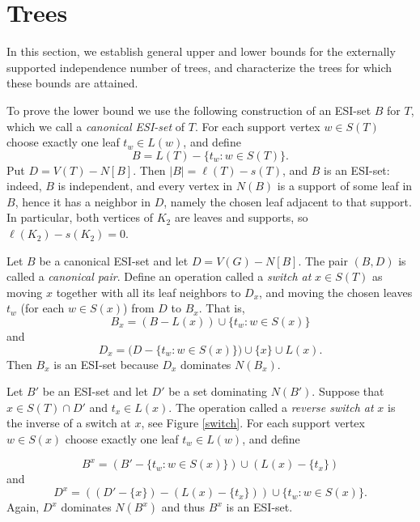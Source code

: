 \documentclass[11pt]{article}
\begin{document}
\section{Trees}\label{tr}


In this section, we establish general upper and lower bounds for the externally supported independence number of trees, and characterize the trees for which these bounds are attained.


To prove the lower bound we use the following construction of an ESI-set $B$ for $T$, which we call a \emph{canonical ESI-set} of $T$. For each support vertex $w\in S(T)$ choose exactly one leaf
$t_w\in L(w)$, and define
$$B=L(T)-\{t_w: w\in S(T)\}.$$
Put $D=V(T)-N[B]$. Then $|B|=\ell(T)-s(T)$, and $B$ is an ESI-set: indeed, $B$ is
independent, and every vertex in $N(B)$ is a support of some leaf in $B$, hence it has a
neighbor in $D$, namely the chosen leaf adjacent to that support. In particular, both vertices of
$K_2$ are leaves and supports, so $\ell(K_2)-s(K_2)=0$.

Let $B$ be a canonical ESI-set and let $D=V(G)-N[B]$. The pair $(B,D)$ is called a \emph{canonical pair}. Define an operation called a \emph{switch at} $x\in S(T)$ as moving $x$ together with all its leaf neighbors to $D_x$, and moving the
chosen leaves $t_w$ (for each $w\in S(x)$) from $D$ to $B_x$. That is,
\[
B_x=(B- L(x))\cup \{t_w:w\in S(x)\}
\]
and
\[
D_x=\bigl(D-\{t_w:w\in S(x)\}\bigr)\cup\{x\}\cup L(x).
\]
Then $B_x$ is an ESI-set because
$D_x$ dominates $N(B_x)$.

Let $B'$ be an ESI-set and let $D'$ be a set dominating $N(B')$. Suppose that $x\in S(T)\cap D'$ and $t_x\in L(x)$. The operation called a \emph{reverse switch at} $x$ is the inverse of a switch at $x$, see Figure \ref{switch}. For each support vertex $w\in S(x)$ choose exactly one leaf
$t_w\in L(w)$, and define
 
\[
B^x=(B'-\{t_w:w\in S(x)\})\cup (L(x)-\{t_x\}) 
\]
and
\[
D^x=((D'-\{x\})-(L(x)-\{t_x\}))\cup \{t_w:w\in S(x)\}.
\]
Again, $D^x$ dominates $N(B^x)$ and thus $B^x$ is an ESI-set. 
\end{document}
